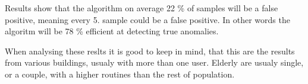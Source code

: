 Results show that the algorithm on average 22 \% of samples will be a false positive, meaning
every 5. sample could be a false positive. In other words the algoritm will be 78 \% efficient at 
detecting true anomalies. 

When analysing these reslts it is good to keep in mind, that this are the results from
various buildings, usualy with more than one user. Elderly are usualy single, or 
a couple, with a higher routines than the rest of population. 